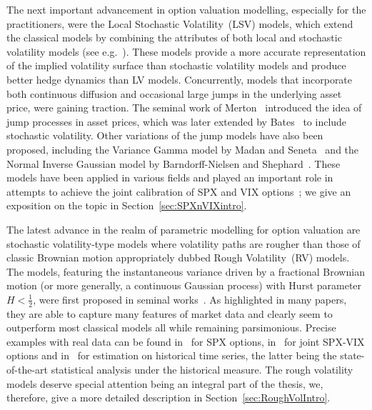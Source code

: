 The next important advancement in option valuation modelling, especially for the practitioners, were the Local Stochastic Volatility~(LSV) models, which extend the classical models by combining the attributes of both local and stochastic volatility models (see e.g.~\cite{Lipton2002TheProblem, Lipton2002UniversalBarriers}). These models provide a more accurate representation of the implied volatility surface than stochastic volatility models and produce better hedge dynamics than LV models. %
Concurrently, models that incorporate both continuous diffusion and occasional large jumps in the underlying asset price, were gaining traction. The seminal work of Merton~\cite{Merton1974ONRATES} introduced the idea of jump processes in asset prices, which was later extended by Bates~\cite{Bates1996JumpsOptions} to include stochastic volatility. %
Other variations of the jump models have also been proposed, including the Variance Gamma model by Madan and Seneta~\cite{Madan1990TheReturns} and the Normal Inverse Gaussian model by Barndorff-Nielsen and Shephard~\cite{Barndorff-Nielsen2001Non-GaussianEconomics}. These models have been applied in various fields and played an important role in attempts to achieve the joint calibration of SPX and VIX options~\cite{Cont2011ADERIVATIVES, Baldeaux2014ConsistentModel, Kokholm2015JointModels}; we give an exposition on the topic in Section~\ref{sec:SPXnVIXintro}. %

The latest advance in the realm of parametric modelling for option valuation are stochastic volatility-type models where volatility paths are rougher than those of classic Brownian motion appropriately dubbed Rough Volatility~(RV) models. The models, featuring the instantaneous variance driven by a fractional Brownian motion (or more generally, a continuous Gaussian process) with Hurst parameter $H < \frac{1}{2}$, were first proposed in seminal works~\cite{Bayer2015PricingVolatility, Gatheral2018VolatilityRough, Guennoun2018AsymptoticModel}. As highlighted in many papers, they are able to capture many features of market data and clearly seem to outperform most classical models all while remaining parsimonious. Precise examples with real data can be found in~\cite{Bayer2015PricingVolatility} for SPX options, in~\cite{Bondi2022TheModel, Gatheral2020TheProblem, Jaber2022JointHints, Horvath2020VolatilityModels} for joint SPX-VIX options and in~\cite{Bennedsen2022DecouplingVolatility, Gatheral2018VolatilityRough} for estimation on historical time series, the latter being the state-of-the-art statistical analysis under the historical measure. The rough volatility models deserve special attention being an integral part of the thesis, we, therefore, give a more detailed description in Section~\ref{sec:RoughVolIntro}.

